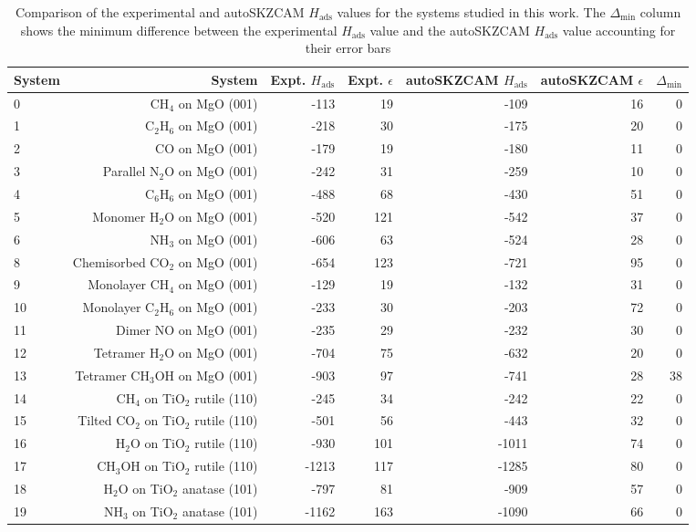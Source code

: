 \begin{table}
\caption{\label{tab:hads_comparison}Comparison of the experimental and autoSKZCAM $H_\textrm{ads}$ values for the systems studied in this work. The $\Delta_\textrm{min}$ column shows the minimum difference between the experimental $H_\textrm{ads}$ value and the autoSKZCAM $H_\textrm{ads}$ value accounting for their error bars}
\begin{adjustbox}{center,max width=0.9\textwidth}
\begin{tabular}{lrrrrrr}
\toprule
System & System & Expt. $H_\textrm{ads}$ & Expt. $\epsilon$ & autoSKZCAM $H_\textrm{ads}$ & autoSKZCAM $\epsilon$ & $\Delta_\textrm{min}$ \\ 
\midrule
0 & CH$_4$ on MgO (001) & -113 & 19 & -109 & 16 & 0 \\
1 & C$_2$H$_6$ on MgO (001) & -218 & 30 & -175 & 20 & 0 \\
2 & CO on MgO (001) & -179 & 19 & -180 & 11 & 0 \\
3 & Parallel N$_2$O on MgO (001) & -242 & 31 & -259 & 10 & 0 \\
4 & C$_6$H$_6$ on MgO (001) & -488 & 68 & -430 & 51 & 0 \\
5 & Monomer H$_2$O on MgO (001) & -520 & 121 & -542 & 37 & 0 \\
6 & NH$_3$ on MgO (001) & -606 & 63 & -524 & 28 & 0 \\
8 & Chemisorbed CO$_2$ on MgO (001) & -654 & 123 & -721 & 95 & 0 \\
9 & Monolayer CH$_4$ on MgO (001) & -129 & 19 & -132 & 31 & 0 \\
10 & Monolayer C$_2$H$_6$ on MgO (001) & -233 & 30 & -203 & 72 & 0 \\
11 & Dimer NO on MgO (001) & -235 & 29 & -232 & 30 & 0 \\
12 & Tetramer H$_2$O on MgO (001) & -704 & 75 & -632 & 20 & 0 \\
13 & Tetramer CH$_3$OH on MgO (001) & -903 & 97 & -741 & 28 & 38 \\
14 & CH$_4$ on TiO$_2$ rutile (110) & -245 & 34 & -242 & 22 & 0 \\
15 & Tilted CO$_2$ on TiO$_2$ rutile (110) & -501 & 56 & -443 & 32 & 0 \\
16 & H$_2$O on TiO$_2$ rutile (110) & -930 & 101 & -1011 & 74 & 0 \\
17 & CH$_3$OH on TiO$_2$ rutile (110) & -1213 & 117 & -1285 & 80 & 0 \\
18 & H$_2$O on TiO$_2$ anatase (101) & -797 & 81 & -909 & 57 & 0 \\
19 & NH$_3$ on TiO$_2$ anatase (101) & -1162 & 163 & -1090 & 66 & 0 \\
\bottomrule
\end{tabular}
\end{adjustbox}
\end{table}